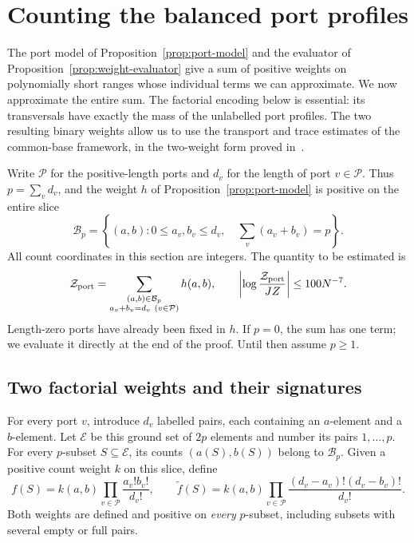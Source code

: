 \section{Counting the balanced port profiles}
\label{sec:counting}

The port model of Proposition~\ref{prop:port-model} and the evaluator
of Proposition~\ref{prop:weight-evaluator} give a sum of positive weights
on polynomially short ranges whose individual terms we can approximate.
We now approximate the entire sum.
The factorial encoding below is essential: its transversals have exactly
the mass of the unlabelled port profiles.  The two resulting binary weights
allow us to use the transport and trace estimates of the common-base
framework, in the two-weight form proved in~\cite{CB}.

Write $\mathcal P$ for the positive-length ports and $d_v$ for the length
of port $v\in\mathcal P$.  Thus $p=\sum_v d_v$, and the weight $h$ of
Proposition~\ref{prop:port-model} is positive on the entire slice
\[
 \mathcal B_p=\left\{(a,b):0\leq a_v,b_v\leq d_v,
                  \quad\sum_v(a_v+b_v)=p\right\}.
\]
All count coordinates in this section are integers.  The quantity to be
estimated is
\begin{equation}
 \mathcal Z_{\rm port}
   =\sum_{\substack{(a,b)\in\mathcal B_p\\a_v+b_v=d_v\ (v\in\mathcal P)}}
           h(a,b),
 \qquad
 \left|\log\frac{\mathcal Z_{\rm port}}{JZ}\right|
        \leq100N^{-7}.
 \label{eq:counting-target}
\end{equation}
Length-zero ports have already been fixed in $h$.  If $p=0$, the sum has
one term; we evaluate it directly at the end of the proof.  Until then
assume $p\geq1$.

\subsection{Two factorial weights and their signatures}

For every port $v$, introduce $d_v$ labelled pairs, each containing an
$a$-element and a $b$-element.  Let $\mathcal E$ be this ground set of
$2p$ elements and number its pairs $1,\ldots,p$.  For every $p$-subset
$S\subseteq\mathcal E$, its counts $(a(S),b(S))$ belong to
$\mathcal B_p$.  Given a positive count weight $k$ on this slice, define
\begin{equation}
 f(S)=k(a,b)\prod_{v\in\mathcal P}\frac{a_v!b_v!}{d_v!},
 \qquad
 \widetilde f(S)=k(a,b)
       \prod_{v\in\mathcal P}\frac{(d_v-a_v)!(d_v-b_v)!}{d_v!}.
 \label{eq:counting-lifts}
\end{equation}
Both weights are defined and positive on \emph{every} $p$-subset, including
subsets with several empty or full pairs.

